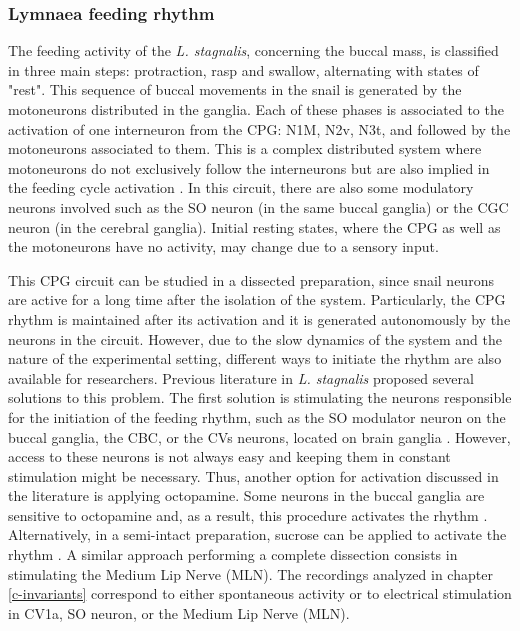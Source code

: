 \subsubsection{Lymnaea feeding rhythm}

The feeding activity of the \textit{L. stagnalis}, concerning the buccal mass, is classified in three main steps: protraction, rasp and swallow, alternating with states of "rest". This sequence of buccal movements in the snail is generated by the motoneurons distributed in the ganglia. Each of these phases is associated to the activation of one interneuron from the CPG: N1M, N2v, N3t, and followed by the motoneurons associated to them. This is a complex distributed system where motoneurons do not exclusively follow the interneurons but are also implied in the feeding cycle activation \parencite{staras_patterngenerating_1998}. In this circuit, there are also some modulatory neurons involved such as the SO neuron (in the same buccal ganglia) or the CGC neuron (in the cerebral ganglia). Initial resting states, where the CPG as well as the motoneurons have no activity, may change due to a sensory input.


This CPG circuit can be studied in a dissected preparation, since snail neurons are active for a long time after the isolation of the system. Particularly, the CPG rhythm is maintained after its activation and it is generated autonomously by the neurons in the circuit. However, due to the slow dynamics of the system and the nature of the experimental setting, different ways to initiate the rhythm are also available for researchers. Previous literature in \textit{L. stagnalis} proposed several solutions to this problem. The first solution is stimulating the neurons responsible for the initiation of the feeding rhythm, such as the SO modulator neuron on the buccal ganglia, the CBC, or the CVs neurons, located on brain ganglia \parencite{benjamin_distributed_2012}. However, access to these neurons is not always easy and keeping them in constant stimulation might be necessary. Thus, another option for activation discussed in the literature is applying octopamine. Some neurons in the buccal ganglia are sensitive to octopamine and, as a result, this procedure activates the rhythm \parencite{vehovszky_octopaminecontaining_2004}. Alternatively, in a semi-intact preparation, sucrose can be applied to activate the rhythm \parencite{vavoulis_dynamic_2007,vehovszky_octopaminecontaining_2004,straub_endogenous_2002}. A similar approach performing a complete dissection consists in stimulating the Medium Lip Nerve (MLN). 
The recordings analyzed in chapter \ref{c-invariants} correspond to either spontaneous activity or to electrical stimulation in CV1a, SO neuron, or the Medium Lip Nerve (MLN).

